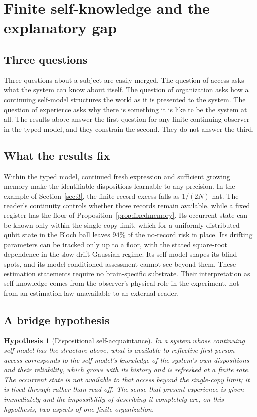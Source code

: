 \documentclass[12pt]{article}
\newtheorem{hypothesis}[theorem]{Hypothesis}
\theoremstyle{definition}
\theoremstyle{remark}
\begin{document}
\section{Finite self-knowledge and the explanatory gap}\label{sec:bridge}

\subsection{Three questions}

Three questions about a subject are easily merged. The question of access asks what the system can know about itself. The question of organization asks how a continuing self-model structures the world as it is presented to the system. The question of experience asks why there is something it is like to be the system at all. The results above answer the first question for any finite continuing observer in the typed model, and they constrain the second. They do not answer the third.

\subsection{What the results fix}

Within the typed model, continued fresh expression and sufficient growing memory make the identifiable dispositions learnable to any precision. In the example of Section~\ref{sec:3}, the finite-record excess falls as $1/(2N)$ nat. The reader's continuity controls whether those records remain available, while a fixed register has the floor of Proposition~\ref{prop:fixedmemory}. Its occurrent state can be known only within the single-copy limit, which for a uniformly distributed qubit state in the Bloch ball leaves $94\%$ of the no-record risk in place. Its drifting parameters can be tracked only up to a floor, with the stated square-root dependence in the slow-drift Gaussian regime. Its self-model shapes its blind spots, and its model-conditioned assessment cannot see beyond them. These estimation statements require no brain-specific substrate. Their interpretation as self-knowledge comes from the observer's physical role in the experiment, not from an estimation law unavailable to an external reader.

\subsection{A bridge hypothesis}

\begin{hypothesis}[Dispositional self-acquaintance]\label{hyp:bridge}
In a system whose continuing self-model has the structure above, what is available to reflective first-person access corresponds to the self-model's knowledge of the system's own dispositions and their reliability, which grows with its history and is refreshed at a finite rate. The occurrent state is not available to that access beyond the single-copy limit; it is lived through rather than read off. The sense that present experience is given immediately and the impossibility of describing it completely are, on this hypothesis, two aspects of one finite organization.
\end{hypothesis}
\end{document}
